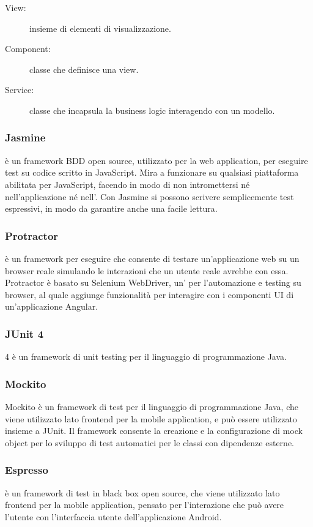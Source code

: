 \documentclass[../manuale-manutentore.tex]{subfiles}
\begin{document}
\begin{description}
    \item[View:] insieme di elementi di visualizzazione.
    \item[Component:] classe che definisce una view.
    \item[Service:] classe che incapsula la business logic interagendo con un modello.
\end{description}

\subsubsection{Jasmine}%
\label{subs:jasmine}

 è un framework BDD open source, utilizzato per la web application, per eseguire test su codice scritto in JavaScript.
Mira a funzionare su qualsiasi piattaforma abilitata per JavaScript, facendo in modo di non intromettersi né nell'applicazione né nell'.
Con Jasmine si possono scrivere semplicemente test espressivi, in modo da garantire anche una facile lettura.

\subsubsection{Protractor}%
\label{subs:protractor}

 è un framework per eseguire  che consente di testare un'applicazione web su un browser reale simulando le interazioni che un utente reale avrebbe con essa.
Protractor è basato su Selenium WebDriver, un' per l'automazione e testing su browser, al quale aggiunge funzionalità per interagire con i componenti UI di un'applicazione Angular.

\subsubsection{JUnit 4}%
\label{subs:junit4}

 4 è un framework di unit testing per il linguaggio di programmazione Java.

\subsubsection{Mockito}%
\label{subs:mockito}

Mockito è un framework di test per il linguaggio di programmazione Java, che viene utilizzato lato frontend per la mobile application, e può essere utilizzato insieme a JUnit.
Il framework consente la creazione e la configurazione di mock object per lo sviluppo di test automatici per le classi con dipendenze esterne.

\subsubsection{Espresso}%
\label{subs:espresso}

 è un framework di test in black box open source, che viene utilizzato lato frontend per la mobile application, pensato per l'interazione che può avere l'utente con l'interfaccia utente dell'applicazione Android.
\end{document}
